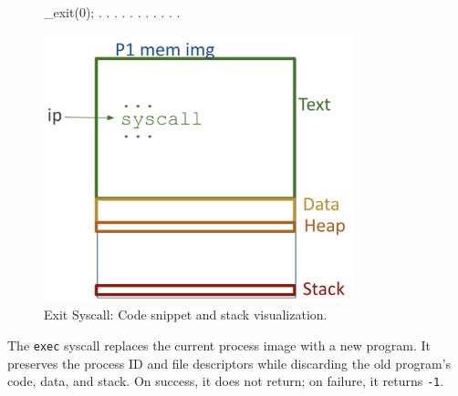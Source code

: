 \documentclass[../../compsys.tex]{subfiles}
\begin{document}
\begin{figure}[htp]
  \centering
  \begin{minipage}[htp]{0.45\textwidth}
\begin{cc}
_exit(0);
. 
. 
. 
. 
. 
. 
. 
. 
. 
. 
. 
\end{cc}
  \end{minipage}
  \hfill
  \vline
  \hfill
  \begin{minipage}[htp]{0.45\textwidth}
    \centering
    \includegraphics[width=0.8\textwidth]{chapters/L3/images/exit.png}
  \end{minipage}
  \caption{Exit Syscall: Code snippet and stack visualization.}
\end{figure}
\newpage
\begin{definition}
The \texttt{exec} syscall replaces the current process image with a new program. It preserves the process ID and file descriptors while discarding the old program's code, data, and stack. On success, it does not return; on failure, it returns \texttt{-1}.
\end{definition}
\end{document}
